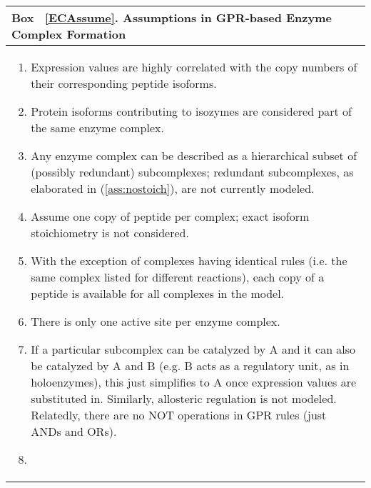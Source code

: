 \begin{methods}
\label{ECAssume}
\begin{center}
\begin{tabular}{| p{14cm} |}
\hline
\textbf{Box ~\ref{ECAssume}. Assumptions in GPR-based Enzyme Complex Formation} \\
\hline
\begin{enumerate}
\item \begin{assume} \label{ass:expcorr}
Expression values are highly correlated with the copy numbers of their
corresponding peptide isoforms.
\end{assume}
\item \begin{assume} \label{ass:isozyme} 
Protein isoforms contributing to isozymes are considered part of the
same enzyme complex.
\end{assume}
\item \begin{assume} \label{ass:hierarchy}
Any enzyme complex can be described as a hierarchical subset of
(possibly redundant) subcomplexes; redundant subcomplexes, as
elaborated in (\ref{ass:nostoich}), are not currently modeled.
\end{assume}
\item \begin{assume} \label{ass:nostoich} 
Assume one copy of peptide per complex; exact isoform stoichiometry
is not considered.
\end{assume}
\item \begin{assume} \label{ass:sharing} 
With the exception of complexes having identical rules (i.e. the same
complex listed for different reactions), each copy of a peptide
is available for all complexes in the model.
\end{assume}
\item \begin{assume} \label{ass:active_site}
There is only one active site per enzyme complex.
\end{assume}
\item \begin{assume} \label{ass:holo} 
If a particular subcomplex can be catalyzed by A and it can also be
catalyzed by A and B (e.g. B acts as a regulatory unit, as in
holoenzymes), this just simplifies to A once expression values are
substituted in. Similarly, allosteric regulation is not
modeled. Relatedly, there are no NOT operations in GPR rules (just ANDs
and ORs).
\end{assume}
\item \begin{assume} \label{ass:chap} 

\end{assume}
\end{enumerate}
\end{tabular}
\end{center}
\end{methods}
